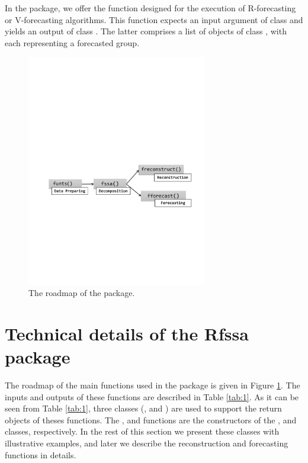 In the  package, we offer the  function 
designed for the execution of R-forecasting or V-forecasting algorithms. This 
function expects an input argument of class  and yields an output of 
class . The latter comprises a list of objects of class 
, with each  representing a forecasted group.


\begin{figure}[b!]
	\centering
	\includegraphics[page=1,width=0.7\textwidth]{figures/roadmap.pdf}
	\caption{The roadmap of the  package.}
	\label{fig:roadpap}
\end{figure}

\section{Technical details of the Rfssa package}\label{sec:Technical}
The roadmap of the main functions used in the  package is given in Figure 
\ref{fig:roadpap}. The inputs and outputs of these functions are described in Table 
\ref{tab:1}. As it can be seen from Table \ref{tab:1},  three classes 
(,  and ) are used to support the return 
objects of theses functions. The ,  and 
 functions are the constructors of the , 
 and  classes, respectively. In the rest of this 
section we present these classes with illustrative examples, and later we 
describe the reconstruction and forecasting functions in details.

